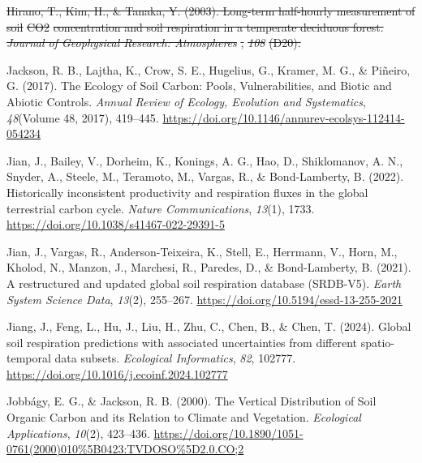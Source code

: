 \documentclass[
  letterpaper,
  DIV=11,
  numbers=noendperiod]{scrartcl}
\newlength{\cslhangindent}
\newenvironment{CSLReferences}[2] %
 {\begin{list}{}{%
  \setlength{\itemindent}{0pt}
  \setlength{\leftmargin}{0pt}
  \setlength{\parsep}{0pt}
  \ifodd #1
   \setlength{\leftmargin}{\cslhangindent}
   \setlength{\itemindent}{-1\cslhangindent}
  \fi
  \setlength{\itemsep}{#2\baselineskip}}}
 {\end{list}}
\providecommand{\DIFdel}[1]{{\protect\color{red}\sout{#1}}}                      %
\providecommand{\DIFdelbegin}{} %
\providecommand{\DIFdelend}{} %
\newcommand{\DIFscaledelfig}{0.5}
\newlength{\DIFdelgraphicswidth} %
\newlength{\DIFdelgraphicsheight} %
\newcommand{\DIFdelincludegraphics}[2][]{%
\sbox{\DIFdelgraphicsbox}{\DIFOincludegraphics[#1]{#2}}%
\settoboxwidth{\DIFdelgraphicswidth}{\DIFdelgraphicsbox} %
\settoboxtotalheight{\DIFdelgraphicsheight}{\DIFdelgraphicsbox} %
\scalebox{\DIFscaledelfig}{%
\parbox[b]{\DIFdelgraphicswidth}{\usebox{\DIFdelgraphicsbox}\\[-\baselineskip] \rule{\DIFdelgraphicswidth}{0em}}\llap{\resizebox{\DIFdelgraphicswidth}{\DIFdelgraphicsheight}{%
\setlength{\unitlength}{\DIFdelgraphicswidth}%
\begin{picture}(1,1)%
\thicklines\linethickness{2pt} %
{\color[rgb]{1,0,0}\put(0,0){\framebox(1,1){}}}%
{\color[rgb]{1,0,0}\put(0,0){\line( 1,1){1}}}%
{\color[rgb]{1,0,0}\put(0,1){\line(1,-1){1}}}%
\end{picture}%
}\hspace*{3pt}}} %
} %
\DeclareRobustCommand{\DIFdelbegin}{\DIFOdelbegin \let\includegraphics\DIFdelincludegraphics} %
\DeclareRobustCommand{\DIFdelend}{\DIFOaddend \let\includegraphics\DIFOincludegraphics} %
\begin{document}
\begin{CSLReferences}{1}{0}
\DIFdelbegin {}
\DIFdel{Hirano, T., Kim, H., \& Tanaka, Y. (2003). Long-term half-hourly
measurement of soil }%
\DIFdel{CO2}%
\DIFdel{concentration and soil respiration in a
temperate deciduous forest. }\emph{\DIFdel{Journal of Geophysical Research:
Atmospheres}}%
\DIFdel{, }\emph{\DIFdel{108}}%
\DIFdel{(D20).
}%

\DIFdelend {}
Jackson, R. B., Lajtha, K., Crow, S. E., Hugelius, G., Kramer, M. G., \&
Piñeiro, G. (2017). The {Ecology} of {Soil Carbon}: {Pools},
{Vulnerabilities}, and {Biotic} and {Abiotic Controls}. \emph{Annual
Review of Ecology, Evolution and Systematics}, \emph{48}(Volume 48,
2017), 419--445.
\url{https://doi.org/10.1146/annurev-ecolsys-112414-054234}

Jian, J., Bailey, V., Dorheim, K., Konings, A. G., Hao, D., Shiklomanov,
A. N., Snyder, A., Steele, M., Teramoto, M., Vargas, R., \&
Bond-Lamberty, B. (2022). Historically inconsistent productivity and
respiration fluxes in the global terrestrial carbon cycle. \emph{Nature
Communications}, \emph{13}(1), 1733.
\url{https://doi.org/10.1038/s41467-022-29391-5}

Jian, J., Vargas, R., Anderson-Teixeira, K., Stell, E., Herrmann, V.,
Horn, M., Kholod, N., Manzon, J., Marchesi, R., Paredes, D., \&
Bond-Lamberty, B. (2021). A restructured and updated global soil
respiration database ({SRDB-V5}). \emph{Earth System Science Data},
\emph{13}(2), 255--267. \url{https://doi.org/10.5194/essd-13-255-2021}

Jiang, J., Feng, L., Hu, J., Liu, H., Zhu, C., Chen, B., \& Chen, T.
(2024). Global soil respiration predictions with associated
uncertainties from different spatio-temporal data subsets.
\emph{Ecological Informatics}, \emph{82}, 102777.
\url{https://doi.org/10.1016/j.ecoinf.2024.102777}

Jobbágy, E. G., \& Jackson, R. B. (2000). The {Vertical Distribution} of
{Soil Organic Carbon} and its {Relation} to {Climate} and {Vegetation}.
\emph{Ecological Applications}, \emph{10}(2), 423--436.
\url{https://doi.org/10.1890/1051-0761(2000)010\%5B0423:TVDOSO\%5D2.0.CO;2}


\end{CSLReferences}
\end{document}
